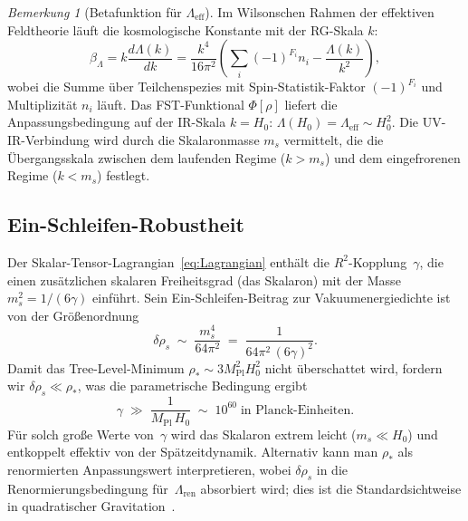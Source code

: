 \documentclass[12pt,a4paper]{article}
\theoremstyle{definition}
\theoremstyle{plain}
\theoremstyle{remark}
\newtheorem{remark}[definition]{Bemerkung}
\begin{document}
\begin{remark}[Betafunktion f\"ur $\Lambda_{\mathrm{eff}}$]
\label{rem:beta-lambda}
Im Wilsonschen Rahmen der effektiven Feldtheorie l\"auft die kosmologische Konstante mit der RG-Skala $k$:
\[
\beta_\Lambda = k \frac{d\Lambda(k)}{dk} = \frac{k^4}{16\pi^2} \left( \sum_i (-1)^{F_i} n_i - \frac{\Lambda(k)}{k^2} \right),
\]
wobei die Summe \"uber Teilchenspezies mit Spin-Statistik-Faktor $(-1)^{F_i}$ und Multiplizit\"at $n_i$ l\"auft. Das FST-Funktional $\Phi[\rho]$ liefert die Anpassungsbedingung auf der IR-Skala $k = H_0$: $\Lambda(H_0) = \Lambda_{\mathrm{eff}} \sim H_0^2$. Die UV-IR-Verbindung wird durch die Skalaronmasse $m_s$ vermittelt, die die \"Ubergangsskala zwischen dem laufenden Regime ($k > m_s$) und dem eingefrorenen Regime ($k < m_s$) festlegt.
\end{remark}

\subsection{Ein-Schleifen-Robustheit}\label{sec:one-loop}

Der Skalar-Tensor-Lagrangian~\eqref{eq:Lagrangian} enth\"alt die
$R^2$-Kopplung~$\gamma$, die einen zus\"atzlichen skalaren
Freiheitsgrad (das Skalaron) mit der Masse
$m_s^2 = 1/(6\gamma)$ einf\"uhrt. Sein
Ein-Schleifen-Beitrag zur Vakuumenergiedichte ist von der
Gr\"o\ss enordnung
\begin{equation}\label{eq:delta-rho-scalaron}
  \delta\rho_s
  \;\sim\; \frac{m_s^4}{64\pi^2}
  \;=\; \frac{1}{64\pi^2\,(6\gamma)^2}.
\end{equation}
Damit das Tree-Level-Minimum $\rho_\ast \sim 3M_{\mathrm{Pl}}^2 H_0^2$
nicht \"uberschattet wird, fordern wir $\delta\rho_s \ll \rho_\ast$,
was die parametrische Bedingung ergibt
\begin{equation}\label{eq:gamma-bound}
  \gamma \;\gg\; \frac{1}{M_{\mathrm{Pl}}\,H_0}
  \;\sim\; 10^{60}\;\text{in Planck-Einheiten}.
\end{equation}
F\"ur solch gro\ss e Werte von~$\gamma$ wird das Skalaron extrem leicht
($m_s \ll H_0$) und entkoppelt effektiv von der Sp\"atzeitdynamik.
Alternativ kann man $\rho_\ast$ als renormierten Anpassungswert
interpretieren, wobei $\delta\rho_s$ in die
Renormierungsbedingung f\"ur~$\Lambda_{\mathrm{ren}}$ absorbiert wird;
dies ist die Standardsichtweise in quadratischer
Gravitation~\cite{SotiriouFaraoni2010}.
\end{document}
